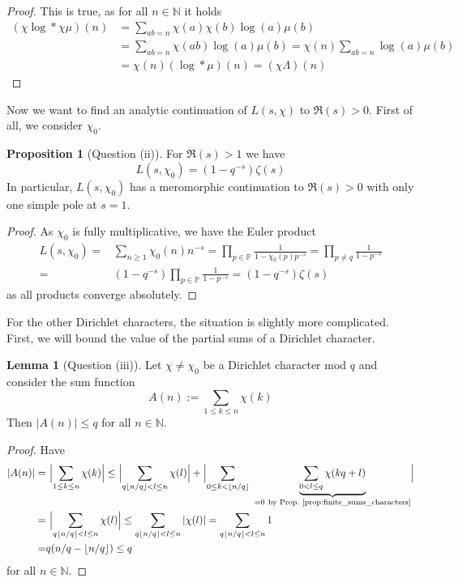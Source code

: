 \documentclass{scrartcl}
\newcommand{\primes}{\mathbb{P}}
\newcommand{\N}{\mathbb{N}}
\theoremstyle{definition}
\newtheorem{lemma}[definition]{Lemma}
\newtheorem{proposition}[definition]{Proposition}
\begin{document}
\begin{proof}
    This is true, as for all $n \in \N$ it holds
    \begin{align*}
        (\chi\log * \chi\mu)(n) &= \sum_{ab = n} \chi(a)\chi(b) \log(a)\mu(b) \\
        &= \sum_{ab = n} \chi(ab) \log(a)\mu(b) = \chi(n) \sum_{ab = n} \log(a) \mu(b) \\
        &= \chi(n) (\log * \mu)(n) = (\chi\Lambda)(n)
    \end{align*}
\end{proof}
Now we want to find an analytic continuation of $L(s, \chi)$ to $\Re(s) > 0$.
First of all, we consider $\chi_0$.
\begin{proposition}[Question (ii)]
    \label{prop:formula_trivial_L_series}
    For $\Re(s) > 1$ we have
    \begin{equation*}
        L(s, \chi_0) = (1 - q^{-s}) \zeta(s)
    \end{equation*}
    In particular, $L(s, \chi_0)$ has a meromorphic continuation to $\Re(s) > 0$ with only one simple pole at $s = 1$.
\end{proposition}
\begin{proof}
    As $\chi_0$ is fully multiplicative, we have the Euler product
    \begin{align*}
        L(s, \chi_0) =& \sum_{n \geq 1} \chi_0(n) n^{-s} = \prod_{p \in \primes} \frac 1 {1 - \chi_0(p)p^{-s}} = \prod_{p \neq q} \frac 1 {1 - p^{-s}} \\
        =& (1 - q^{-s}) \prod_{p \in \primes} \frac 1 {1 - p^{-s}} = (1 - q^{-s}) \zeta(s)
    \end{align*}
    as all products converge absolutely.
\end{proof}
For the other Dirichlet characters, the situation is slightly more complicated.
First, we will bound the value of the partial sums of a Dirichlet character.
\begin{lemma}[Question (iii)]
    \label{prop:bound_partsums_character}
    Let $\chi \neq \chi_0$ be a Dirichlet character mod $q$ and consider the sum function
    \begin{equation*}
        A(n) := \sum_{1 \leq k \leq n} \chi(k)
    \end{equation*}
    Then $|A(n)| \leq q$ for all $n \in \N$.
\end{lemma}
\begin{proof}
    Have
    \begin{align*}
        |A(n)| =& \ \Bigl| \sum_{1 \leq k \leq n} \chi(k) \Bigr| \leq \Bigl| \sum_{q\lfloor n/q \rfloor < l \leq n} \chi(l) \Bigr| + \Bigl| \sum_{0 \leq k < \lfloor n/q \rfloor} \ \underbrace{\sum_{0 < l \leq q} \chi(kq + l)}_{= 0 \ \text{by Prop.~\ref{prop:finite_sums_characters}}} \Bigr| \\
        =& \ \Bigl| \sum_{q\lfloor n/q \rfloor < l \leq n} \chi(l) \Bigr| \leq \sum_{q\lfloor n/q \rfloor < l \leq n} |\chi(l)| = \sum_{q\lfloor n/q \rfloor < l \leq n} 1 \\
        =& q(n/q - \lfloor n/q \rfloor) \leq q
    \end{align*}
    for all $n \in \N$.
\end{proof}
\end{document}

